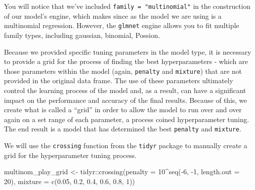 \documentclass[
  letterpaper,
]{krantz}
\newenvironment{Shaded}{\begin{snugshade}}{\end{snugshade}}
\newcommand{\AttributeTok}[1]{\textcolor[rgb]{0.40,0.45,0.13}{#1}}
\newcommand{\DecValTok}[1]{\textcolor[rgb]{0.68,0.00,0.00}{#1}}
\newcommand{\FloatTok}[1]{\textcolor[rgb]{0.68,0.00,0.00}{#1}}
\newcommand{\FunctionTok}[1]{\textcolor[rgb]{0.28,0.35,0.67}{#1}}
\newcommand{\NormalTok}[1]{\textcolor[rgb]{0.00,0.23,0.31}{#1}}
\newcommand{\OtherTok}[1]{\textcolor[rgb]{0.00,0.23,0.31}{#1}}
\newcommand{\SpecialCharTok}[1]{\textcolor[rgb]{0.37,0.37,0.37}{#1}}
\begin{document}
\begin{tcolorbox}[enhanced jigsaw, left=2mm, toprule=.15mm, opacitybacktitle=0.6, leftrule=.75mm, bottomrule=.15mm, colbacktitle=quarto-callout-note-color!10!white, breakable, colback=white, bottomtitle=1mm, toptitle=1mm, title=\textcolor{quarto-callout-note-color}{\faInfo}\hspace{0.5em}{Note}, coltitle=black, titlerule=0mm, arc=.35mm, opacityback=0, colframe=quarto-callout-note-color-frame, rightrule=.15mm]

You will notice that we've included \texttt{family\ =\ "multinomial"} in
the construction of our model's engine, which makes since as the model
we are using is a multinomial regression. However, the \texttt{glmnet}
engine allows you to fit multiple family types, including gaussian,
binomial, Possion.

\end{tcolorbox}

Because we provided specific tuning parameters in the model type, it is
necessary to provide a grid for the process of finding the best
hyperparameters - which are those parameters within the model (again,
\texttt{penalty} and \texttt{mixture}) that are not provided in the
original data frame. The use of these parameters ultimately control the
learning process of the model and, as a result, can have a significant
impact on the performance and accuracy of the final results. Because of
this, we create what is called a ``grid'' in order to allow the model to
run over and over again on a set range of each parameter, a process
coined hyperparameter tuning. The end result is a model that has
determined the best \texttt{penalty} and \texttt{mixture}.

We will use the \texttt{crossing} function from the \texttt{tidyr}
package to manually create a grid for the hyperparameter tuning process.

\begin{Shaded}
\begin{Highlighting}[]
\NormalTok{multinom\_play\_grid }\OtherTok{\textless{}{-}}\NormalTok{ tidyr}\SpecialCharTok{::}\FunctionTok{crossing}\NormalTok{(}\AttributeTok{penalty =} \DecValTok{10}\SpecialCharTok{\^{}}\FunctionTok{seq}\NormalTok{(}\SpecialCharTok{{-}}\DecValTok{6}\NormalTok{, }\SpecialCharTok{{-}}\DecValTok{1}\NormalTok{,}
                                                       \AttributeTok{length.out =} \DecValTok{20}\NormalTok{),}
                                      \AttributeTok{mixture =} \FunctionTok{c}\NormalTok{(}\FloatTok{0.05}\NormalTok{, }\FloatTok{0.2}\NormalTok{,}
                                                  \FloatTok{0.4}\NormalTok{, }\FloatTok{0.6}\NormalTok{,}
                                                  \FloatTok{0.8}\NormalTok{, }\DecValTok{1}\NormalTok{))}
\end{Highlighting}
\end{Shaded}
\end{document}
